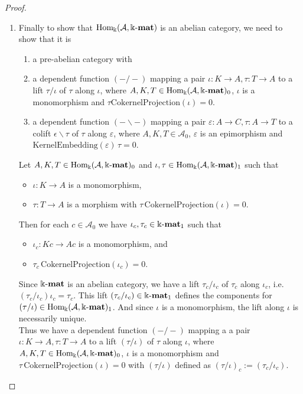 \begin{proof}
\begin{enumerate}
\item Finally to show that $\mathrm{Hom_{\Bbbk}}(\mathcal{A},\Bbbk\textnormal{-}\mathbf{mat})$ is an abelian category, we need to show that it is
\begin{enumerate}
\renewcommand{\labelenumii}{(\roman{enumii})}
\item a pre-abelian category with
\item a dependent function $(-/-)$ mapping a pair $\iota : K \rightarrow A, \tau : T \rightarrow A$ to a lift $\tau / \iota$ of
$\tau$ along $\iota$, where $A, K, T \in \mathrm{Hom_{\Bbbk}}(\mathcal{A},\Bbbk\textnormal{-}\mathbf{mat})_{0}$, $\iota$ is a monomorphism and $\tau \mathrm{CokernelProjection}(\iota) = 0$.
\item a dependent function $(-\backslash -)$ mapping a pair $\varepsilon : A \rightarrow C, \tau : A \rightarrow T$ to a colift
$\epsilon \backslash \tau$ of $\tau$ along $\varepsilon$, where $A, K, T \in \mathcal{A}_{0}$, $\varepsilon$ is an epimorphism and
$\mathrm{KernelEmbedding}(\varepsilon)\,\tau = 0$.
\end{enumerate}
\begin{subproof}
Let $A, K, T \in \mathrm{Hom_{\Bbbk}}(\mathcal{A},\Bbbk\textnormal{-}\mathbf{mat})_{0}$ and $\iota, \tau \in \mathrm{Hom_{\Bbbk}}(\mathcal{A},\Bbbk\textnormal{-}\mathbf{mat})_{1}$ such that 
\begin{itemize}
\item $\iota : K \rightarrow A$ is a monomorphism,
\item $\tau : T \rightarrow A$ is a morphism with $\tau \, \mathrm{CokernelProjection}(\iota) = 0$.
\end{itemize}
Then for each $c \in \mathcal{A}_{0}$ we have $\iota_{c}, \tau_{c} \in \Bbbk\textnormal{-}\mathbf{mat}_{1}$ such that
\begin{itemize}
\item $\iota_{c} : Kc \rightarrow Ac$ is a monomorphism, and
\item $\tau_{c} \, \mathrm{CokernelProjection}(\iota_{c}) = 0$.
\end{itemize}
Since $\Bbbk\textnormal{-}\mathbf{mat}$ is an abelian category, we have a lift $\tau_{c} / \iota_{c}$ of $\tau_{c}$ along $\iota_{c}$, i.e.
$(\tau_{c} / \iota_{c}) \iota_{c} = \tau_{c}$.
This lift $(\tau_{c} / \iota_{c}) \in \Bbbk\textnormal{-}\mathbf{mat}_{1}$ defines the components for $(\tau / \iota) \in \mathrm{Hom_{\Bbbk}}(\mathcal{A},\Bbbk\textnormal{-}\mathbf{mat})_{1}$. And since
$\iota$ is a monomorphism, the lift along $\iota$ is necessarily unique.\\
Thus we have a dependent function $( - / - )$ mapping a
a pair $\iota : K \rightarrow A, \tau : T \rightarrow A$ to a lift $(\tau / \iota)$ of
$\tau$ along $\iota$, where $A, K, T \in \mathrm{Hom_{\Bbbk}}(\mathcal{A},\Bbbk\textnormal{-}\mathbf{mat})_{0}$, $\iota$ is a monomorphism and $\tau \, \mathrm{CokernelProjection}(\iota) = 0$
with $(\tau / \iota)$ defined as $(\tau / \iota)_{c} := (\tau_{c} / \iota_{c})$.



\end{subproof}
\end{enumerate}
\end{proof}
